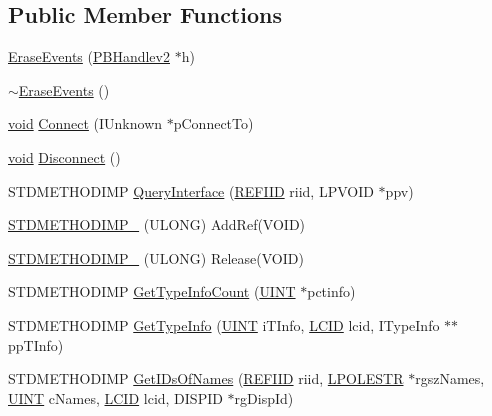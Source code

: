 \subsection*{Public Member Functions}
\begin{DoxyCompactItemize}
\item 
\hyperlink{class_erase_events_a3812c305f99960e080b1db54f5fc8d18}{Erase\+Events} (\hyperlink{struct_p_b_handlev2}{P\+B\+Handlev2} $\ast$h)
\item 
\hyperlink{class_erase_events_a079477b144301578107920395fbc413b}{$\sim$\+Erase\+Events} ()
\item 
\hyperlink{sound_8c_ae35f5844602719cf66324f4de2a658b3}{void} \hyperlink{class_erase_events_a02568ed344ec2c36fa81caec5a7a1504}{Connect} (I\+Unknown $\ast$p\+Connect\+To)
\item 
\hyperlink{sound_8c_ae35f5844602719cf66324f4de2a658b3}{void} \hyperlink{class_erase_events_adfeacba2ccec809618283059c55a999a}{Disconnect} ()
\item 
S\+T\+D\+M\+E\+T\+H\+O\+D\+I\+MP \hyperlink{class_erase_events_a66503e1f8225fe010bf9a6b4dba50eb3}{Query\+Interface} (\hyperlink{px__win__ds_8c_a80ec49c8ae61e234197d5071d2df497d}{R\+E\+F\+I\+ID} riid, L\+P\+V\+O\+ID $\ast$ppv)
\item 
\hyperlink{class_erase_events_a8caed7e7833a02a61ce66ded32285ce6}{S\+T\+D\+M\+E\+T\+H\+O\+D\+I\+M\+P\+\_\+} (U\+L\+O\+NG) Add\+Ref(V\+O\+ID)
\item 
\hyperlink{class_erase_events_a0180c555634b05b9ac8c3cae1405fbd4}{S\+T\+D\+M\+E\+T\+H\+O\+D\+I\+M\+P\+\_\+} (U\+L\+O\+NG) Release(V\+O\+ID)
\item 
S\+T\+D\+M\+E\+T\+H\+O\+D\+I\+MP \hyperlink{class_erase_events_aa1cfce03f5f5cf6795f9e299b530ee00}{Get\+Type\+Info\+Count} (\hyperlink{mapinls_8h_a36cb3b01d81ffd844bbbfb54003e06ec}{U\+I\+NT} $\ast$pctinfo)
\item 
S\+T\+D\+M\+E\+T\+H\+O\+D\+I\+MP \hyperlink{class_erase_events_a8243c31358171e2ad2f4f3b8052e19a7}{Get\+Type\+Info} (\hyperlink{mapinls_8h_a36cb3b01d81ffd844bbbfb54003e06ec}{U\+I\+NT} i\+T\+Info, \hyperlink{mapinls_8h_aad243bba501745d51f6a670ade640986}{L\+C\+ID} lcid, I\+Type\+Info $\ast$$\ast$pp\+T\+Info)
\item 
S\+T\+D\+M\+E\+T\+H\+O\+D\+I\+MP \hyperlink{class_erase_events_ae2b72c47bc95c80ecece6bf1b7cb5792}{Get\+I\+Ds\+Of\+Names} (\hyperlink{px__win__ds_8c_a80ec49c8ae61e234197d5071d2df497d}{R\+E\+F\+I\+ID} riid, \hyperlink{mapinls_8h_a7bf421fbb1651000d29827aa4e1a1d7f}{L\+P\+O\+L\+E\+S\+TR} $\ast$rgsz\+Names, \hyperlink{mapinls_8h_a36cb3b01d81ffd844bbbfb54003e06ec}{U\+I\+NT} c\+Names, \hyperlink{mapinls_8h_aad243bba501745d51f6a670ade640986}{L\+C\+ID} lcid, D\+I\+S\+P\+ID $\ast$rg\+Disp\+Id)
$$
\end{DoxyCompactItemize}
